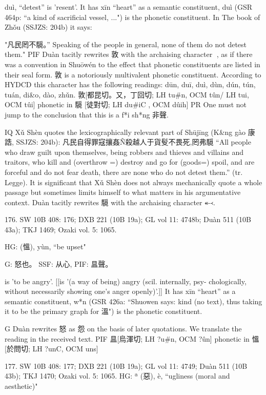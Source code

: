 duì, ``detest'' is 'resent'.
It has xīn ``heart'' as a semantic constituent,
duì (GSR 464p: ``a kind of sacrificial vessel, ...") is the phonetic constituent.
In The book of Zhǒu (SSJZS: 204b) it says:

"凡民罔不䮭。'' Speaking of the people in general, none of them do not detest them."
PIF	Duàn tacitly rewrites 敦 with the archaising character ㇫, as if there was a convention in
Shuōwén to the effect that phonetic constituents are listed in their seal form.
    敦 is a notoriously multivalent phonetic constituent. According to HYDCD this character has the following readings: dūn, duī, duì, dùn, dún, tún, tuán, di&o, dào, zhǔn.
    敦[都昆切。又，丁回切; LH tu\#n, OCM tûn/ LH tui, OCM tûi] phonetic in 䮭 [徒對切; LH du\#iC , OCM dûih]
PR	One must not jump to the conclusion that this is a f*i sh*ng 非聲.



IQ Xǔ Shèn quotes the lexicographically relevant part of Shūjīng (K&ng gào 康誥, SSJZS: 204b): 凡民自得罪寇攘姦Ñ殺越人于貨䯭不畏死,罔弗䮭 ``All people who draw guilt upon themselves, being robbers and thieves and villains and traitors, who kill and (overthrow =) destroy and go for (goods=) spoil, and are forceful and do not fear death, there are none who do not detest them.'' (tr. Legge). It is significant that Xǔ Shèn does not always mechanically quote a whole passage but sometimes limits himself to what matters in his argumentative context.
Duàn tacitly rewrites 䮭 with the archaising character ⬷.

176. SW 10B 408: 176; DXB 221 (10B 19a); GL vol 11: 4748b; Duàn 511 (10B 43a); TKJ 1469; Ozaki vol. 5: 1065.

HG:	(慍), yùn, ``be upset"

G:	怒也。
SSF: 从心,
PIF: 昷聲。

is 'to be angry'. [[is '(a way of being) angry (scil. internally, psy- chologically, without necessarily showing one's anger openly)'.]] It has xīn ``heart'' as a semantic constituent,
w*n (GSR 426a: ``Shuowen says: kind (no text), thus taking it to be the primary graph for 溫") is the phonetic constituent.


G	Duàn rewrites 怒 as 怨 on the basis of later quotations. We translate the reading in the received text.
PIF     昷[烏渾切; LH ?u\#n, OCM ?ûn] phonetic in 慍 [於問切; LH ?unC, OCM uns]

177. SW 10B 408: 177; DXB 221 (10B 19a); GL vol 11: 4749; Duàn 511 (10B 43b); TKJ 1470; Ozaki vol. 5: 1065.
HG: ª (惡), è, ``ugliness (moral and aesthetic)"

